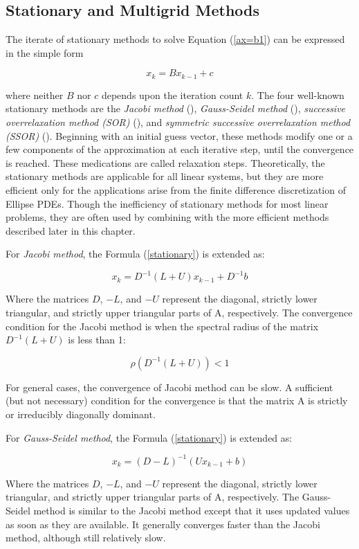 \subsection{Stationary and Multigrid Methods}

The iterate of stationary methods to solve Equation (\ref{ax=b1}) can be expressed in the simple form

\begin{equation}
\label{stationary}
x_k = Bx_{k-1}+c
\end{equation}

where neither $B$ nor $c$ depends upon the iteration count $k$. The four well-known stationary methods are the \textit{Jacobi method} (\cite{yang2014acceleration}), \textit{Gauss-Seidel method} (\cite{yoon1988lower}), \textit{successive overrelaxation method (SOR)} (\cite{adams1982multi}), and \textit{symmetric successive overrelaxation method (SSOR)} (\cite{axelsson1972generalized}). Beginning with an initial guess vector, these methods modify one or a few components of the approximation at each iterative step, until the convergence is reached. These medications are called relaxation steps. Theoretically, the stationary methods are applicable for all linear systems, but they are more efficient only for the applications arise from the finite difference discretization of Ellipse PDEs. Though the inefficiency of stationary methods for most linear problems, they are often used by combining with the more efficient methods described later in this chapter.

For \textit{Jacobi method}, the Formula (\ref{stationary}) is extended as:

\[x_k = D^{-1}(L+U)x_{k-1}+D^{-1}b\]

Where the matrices $D$, $-L$, and $-U$ represent the diagonal, strictly lower triangular, and strictly upper triangular parts of A, respectively. The convergence condition for the Jacobi method is when the spectral radius of the matrix $D^{-1}(L+U)$ is less than 1:

\[\rho(D^{-1}(L+U)) < 1\]

For general cases, the convergence of Jacobi method can be slow. A sufficient (but not necessary) condition for the convergence is that the matrix A is strictly or irreducibly diagonally dominant.

For \textit{Gauss-Seidel method}, the Formula (\ref{stationary}) is extended as:

\[x_k = (D-L)^{-1}(Ux_{k-1}+b)\]

Where the matrices $D$, $-L$, and $-U$ represent the diagonal, strictly lower triangular, and strictly upper triangular parts of A, respectively. The Gauss-Seidel method is similar to the Jacobi method except that it uses updated values as soon as they are available. It generally converges faster than the Jacobi method, although still relatively slow. 

